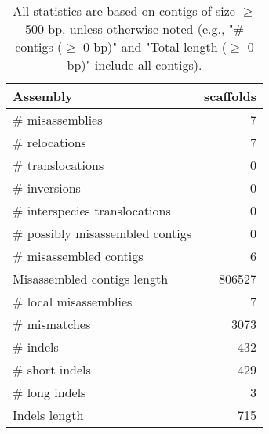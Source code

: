 \documentclass[12pt,a4paper]{article}
\begin{document}
\begin{table}[ht]
\begin{center}
\caption{All statistics are based on contigs of size $\geq$ 500 bp, unless otherwise noted (e.g., "\# contigs ($\geq$ 0 bp)" and "Total length ($\geq$ 0 bp)" include all contigs).}
\begin{tabular}{|l*{1}{|r}|}
\hline
Assembly & scaffolds \\ \hline
\# misassemblies & 7 \\ \hline
\hspace{5mm}\# relocations & 7 \\ \hline
\hspace{5mm}\# translocations & 0 \\ \hline
\hspace{5mm}\# inversions & 0 \\ \hline
\hspace{5mm}\# interspecies translocations & 0 \\ \hline
\# possibly misassembled contigs & 0 \\ \hline
\# misassembled contigs & 6 \\ \hline
Misassembled contigs length & 806527 \\ \hline
\# local misassemblies & 7 \\ \hline
\# mismatches & 3073 \\ \hline
\# indels & 432 \\ \hline
\hspace{5mm}\# short indels & 429 \\ \hline
\hspace{5mm}\# long indels & 3 \\ \hline
Indels length & 715 \\ \hline
\end{tabular}
\end{center}
\end{table}
\end{document}
